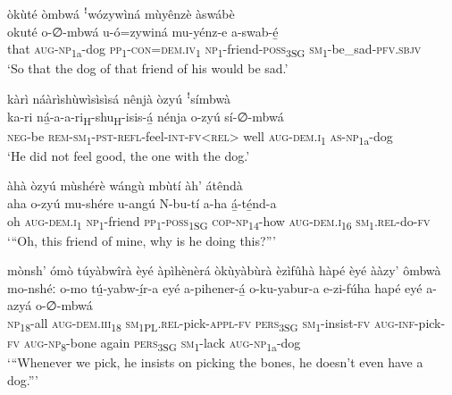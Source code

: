 \newpage
òkùté òmbwá ꜝwózywìná mùyênzè àswábè\\
\gll okuté  o-∅-mbwá    u-ó=zywiná    mu-yénz-e a-swab-é̲ \\
that  \textsc{aug}{}-\textsc{np}\textsubscript{1a}{}-dog  \textsc{pp}\textsubscript{1}{}-\textsc{con}=\textsc{dem}.\textsc{iv}\textsubscript{1}  \textsc{np}\textsubscript{1}{}-friend-\textsc{poss}\textsubscript{3SG}
\textsc{sm}\textsubscript{1}{}-be\_sad-\textsc{pfv}.\textsc{sbjv}\\
\glt ‘So that the dog of that friend of his would be sad.’\bigskip

kàrì náàrìshùwìsìsìsá nênjà òzyú ꜝsímbwà\\
\gll ka-ri    ná̲-a-a-ri\textsubscript{H}{}-shu\textsubscript{H}{}-isis-á̲      nénja  o-zyú    sí-∅-mbwá\\
\textsc{neg}{}-be  \textsc{rem}{}-\textsc{sm}\textsubscript{1}{}-\textsc{pst}{}-\textsc{refl}{}-feel-\textsc{int}{}-\textsc{fv}<\textsc{rel}>  well  \textsc{aug}{}-\textsc{dem}.\textsc{i}\textsubscript{1}  \textsc{as}{}-\textsc{np}\textsubscript{1a}{}-dog\\
\glt ‘He did not feel good, the one with the dog.’\bigskip

àhà òzyú mùshérè wángù mbùtí àh’ átêndà\\
\gll aha  o-zyú    mu-shére  u-angú N-bu-tí    a-ha    á̲-té̲nd-a \\
oh  \textsc{aug}{}-\textsc{dem}.\textsc{i}\textsubscript{1}  \textsc{np}\textsubscript{1}{}-friend  \textsc{pp}\textsubscript{1}{}-\textsc{poss}\textsubscript{1SG}
\textsc{cop}{}-\textsc{np}\textsubscript{14}{}-how  \textsc{aug}{}-\textsc{dem}.\textsc{i}\textsubscript{16} \textsc{sm}\textsubscript{1}.\textsc{rel}{}-do-\textsc{fv}\\
\glt ‘“Oh, this friend of mine, why is he doing this?”’\bigskip

mònsh’ ómò túyàbwîrà èyé àpìhènèrá òkùyàbùrà èzìfûhà hàpé èyé ààzy’ ômbwà\\
\gll mo-nshéː  o-mo      tú̲-yabw-í̲r-a      eyé a-pihener-á̲   o-ku-yabur-a  e-zi-fúha  hapé  eyé    a-azyá    o-∅-mbwá \\
\textsc{np}\textsubscript{18}{}-all  \textsc{aug}{}-\textsc{dem}.\textsc{iii}\textsubscript{18}  \textsc{sm}\textsubscript{1PL}.\textsc{rel}{}-pick-\textsc{appl}{}-\textsc{fv}  \textsc{pers}\textsubscript{3SG}
\textsc{sm}\textsubscript{1}{}-insist-\textsc{fv}   \textsc{aug}{}-\textsc{inf}{}-pick-\textsc{fv}  \textsc{aug}{}-\textsc{np}\textsubscript{8}{}-bone
again  \textsc{pers}\textsubscript{3SG}  \textsc{sm}\textsubscript{1}{}-lack  \textsc{aug}{}-\textsc{np}\textsubscript{1a}{}-dog\\
\glt ‘“Whenever we pick, he insists on picking the bones, he doesn’t even have a dog.”’\bigskip

